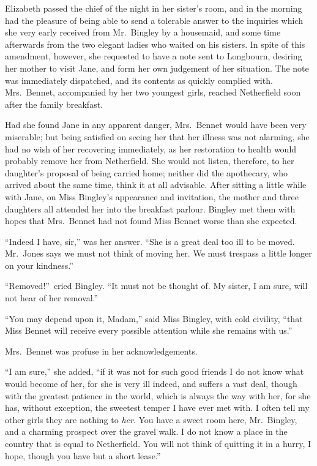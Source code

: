 \documentclass[12pt,english,oneside]{book}
\begin{document}

Elizabeth passed the chief of the night in her sister's room, and
in the morning had the pleasure of being able to send a tolerable
answer to the inquiries which she very early received from Mr.\ Bingley
by a housemaid, and some time afterwards from the two elegant ladies
who waited on his sisters. In spite of this amendment, however, she
requested to have a note sent to Longbourn, desiring her mother to
visit Jane, and form her own judgement of her situation. The note
was immediately dispatched, and its contents as quickly complied with.
Mrs.\ Bennet, accompanied by her two youngest girls, reached Netherfield
soon after the family breakfast.

Had she found Jane in any apparent danger, Mrs.\ Bennet would have
been very miserable; but being satisfied on seeing her that her illness
was not alarming, she had no wish of her recovering immediately, as
her restoration to health would probably remove her from Netherfield.
She would not listen, therefore, to her daughter's proposal of being
carried home; neither did the apothecary, who arrived about the same
time, think it at all advisable. After sitting a little while with
Jane, on Miss Bingley's appearance and invitation, the mother and
three daughters all attended her into the breakfast parlour. Bingley
met them with hopes that Mrs.\ Bennet had not found Miss Bennet worse
than she expected.

{}``Indeed I have, sir,'' was her answer. {}``She is a great deal
too ill to be moved. Mr.\ Jones says we must not think of moving
her. We must trespass a little longer on your kindness.''

{}``Removed!''\ cried Bingley. {}``It must not be thought of.
My sister, I am sure, will not hear of her removal.''

{}``You may depend upon it, Madam,'' said Miss Bingley, with cold
civility, {}``that Miss Bennet will receive every possible attention
while she remains with us.''

Mrs.\ Bennet was profuse in her acknowledgements.

{}``I am sure,'' she added, {}``if it was not for such good friends
I do not know what would become of her, for she is very ill indeed,
and suffers a vast deal, though with the greatest patience in the
world, which is always the way with her, for she has, without exception,
the sweetest temper I have ever met with. I often tell my other girls
they are nothing to \textit{her}. You have a sweet room here, Mr.\ Bingley,
and a charming prospect over the gravel walk. I do not know a place
in the country that is equal to Netherfield. You will not think of
quitting it in a hurry, I hope, though you have but a short lease.''
\end{document}
